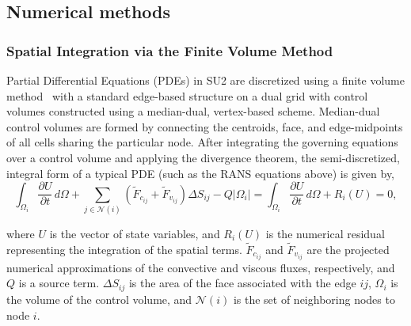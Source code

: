 
\subsection*{Numerical methods}
 

\subsubsection*{Spatial Integration via the Finite Volume Method}

Partial Differential Equations (PDEs) in SU2 are discretized using a finite volume method~\cite{barth95, hirsch1984,quarteroni97, jameson01, leveque02, wesseling00, jameson:1995a, jameson:1995b, toro1999} with a standard edge-based structure on a dual grid with control volumes constructed using a median-dual, vertex-based scheme. Median-dual control volumes are formed by connecting the centroids, face, and edge-midpoints of all cells sharing the particular node. After integrating the governing equations over a control volume and applying the divergence theorem, the semi-discretized, integral form of a typical PDE (such as the RANS equations above) is given by,
\begin{equation} \label{eq:DiscretizedEq}
\int_{\Omega_i}{\frac{\partial{U}}{\partial{t}}}\,d\Omega + \sum_{j \in \mathcal{N}(i)}(\tilde{F}_{c_{ij}}+\tilde{F}_{v_{ij}})\Delta{S}_{ij} -Q|\Omega_i| = \int_{\Omega_i}{\frac{\partial{U}}{\partial{t}}}\,d\Omega + R_i(U) = 0,
\end{equation}
 
where $U$ is the vector of state variables, and $R_i(U)$ is the numerical residual representing the integration of the spatial terms. $\tilde{F}_{c_{ij}}$ and $\tilde{F}_{v_{ij}}$ are the projected numerical approximations of the convective and viscous fluxes, respectively, and $Q$ is a source term. $\Delta{S}_{ij}$ is the area of the face associated with the edge $ij$, $\Omega_i$ is the volume of the control volume, and $\mathcal{N}(i)$ is the set of neighboring nodes to node $i$.

